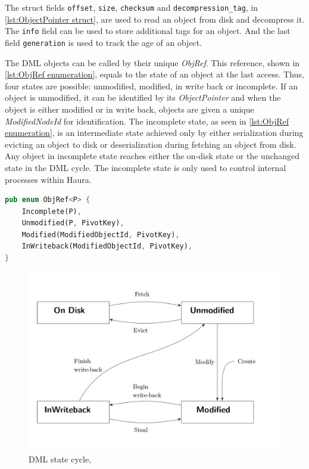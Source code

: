 \documentclass[
	12pt,
	a4paper,
	abstract,
	bibliography=totoc,
	chapterprefix,
	headings=openright,
	numbers=endperiod,
	parskip=half,
	twoside,
]{scrreprt}
\begin{document}
The struct fields \texttt{offset}, \texttt{size}, \texttt{checksum} and \texttt{decompression\_tag}, in \cref{lst:ObjectPointer struct}, 
are used to read an object from disk and decompress it.
The \texttt{info} field can be used to store additional tags for an object.
And the last field \texttt{generation} is used to track the age of an object.

The DML objects can be called by their unique \emph{ObjRef}.
This reference, shown in \cref{lst:ObjRef enumeration}, equals to the state of an object at the last access.
Thus, four states are possible: unmodified, modified, in write back or incomplete.
If an object is unmodified, it can be identified by its \emph{ObjectPointer} and
when the object is either modified or in write back, objects are given a unique \emph{ModifiedNodeId} for identification.
The incomplete state, as seen in \cref{lst:ObjRef enumeration}, is an intermediate state achieved only by either serialization during 
evicting an object to disk or deserialization during fetching an object from disk.
Any object in incomplete state reaches either the on-disk state or the unchanged state in the DML cycle. 
The incomplete state is only used to control internal processes within Haura.

\bigskip

\begin{lstlisting}[language=Rust,mathescape=true,caption={ObjRef enumeration, parameter P equals ObjectPointer<D>},
	label=lst:ObjRef enumeration]
pub enum ObjRef<P> {
    Incomplete(P),
    Unmodified(P, PivotKey),
    Modified(ModifiedObjectId, PivotKey),
    InWriteback(ModifiedObjectId, PivotKey),
}
\end{lstlisting}

\begin{figure}[ht]
	\centering
	\includegraphics[scale=0.4]{DML_state_cycle.jpg}
	\caption{DML state cycle, \cite{wiedemann2018modern}}
		\label{fig:DML state cycle}
\end{figure}
\end{document}
